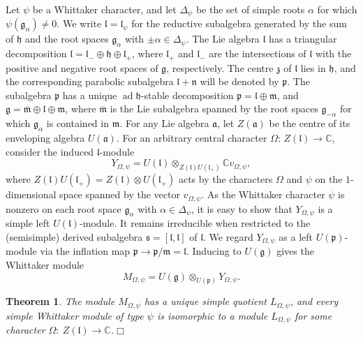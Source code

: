 \documentclass[11pt]{article}
\newtheorem{theorem}[equation]{Theorem}
\numberwithin{equation}{section}
\newcommand{\fg}{\mathfrak{g}}
\newcommand{\ot}{\otimes}
\newcommand{\fh}{{\mathfrak h}}
\newcommand{\ga}{\alpha}
\newcommand{\qed}{\hfill $\Box$}
\begin{document}
Let $\psi$ be a Whittaker character, and let $\Delta_\psi$ be the set of simple roots $\ga$ for which $\psi(\fg_\ga)\neq 0$. We write $\mathfrak{l}=\mathfrak{l}_\psi$ for the reductive subalgebra generated by the sum of $\fh$ and the root spaces $\fg_\ga$ with $\pm\ga\in \Delta_\psi$.  The Lie algebra $\mathfrak{l}$ has a triangular decomposition $\mathfrak{l}=\mathfrak{l}_-\oplus\fh\oplus\mathfrak{l}_+$, where $\mathfrak{l}_+$ and $\mathfrak{l}_-$ are the intersections of $\mathfrak{l}$ with the positive and negative root spaces of $\fg$, respectively.  The centre $\mathfrak{z}$ of $\mathfrak{l}$ lies in $\fh$, and the corresponding parabolic subalgebra $\mathfrak{l}+\mathfrak{n}$ will be denoted by $\mathfrak{p}$.  The subalgebra $\mathfrak{p}$ has a unique $\operatorname{ad}\fh$-stable decomposition $\mathfrak{p}=\mathfrak{l}\oplus\mathfrak{m}$, and $\fg=\overline{\mathfrak{m}}\oplus\mathfrak{l}\oplus\mathfrak{m}$, where $\overline{\mathfrak{m}}$ is the Lie subalgebra spanned by the root spaces $\fg_{-\ga}$ for which $\fg_\ga$ is contained in $\mathfrak{m}$.  For any Lie algebra $\mathfrak{a}$, let  $Z(\mathfrak{a})$ be the centre of its enveloping algebra $U(\mathfrak{a})$.  For an arbitrary central character $\Omega:\,Z(\mathfrak{l})\rightarrow\mathbb{C}$, consider the induced $\mathfrak{l}$-module
$$Y_{\Omega,\psi}=U(\mathfrak{l})\ot_{Z(\mathfrak{l})U(\mathfrak{l}_+)}\mathbb{C}v_{\Omega,\psi},$$
where $Z(\mathfrak{l})U(\mathfrak{l}_+)=Z(\mathfrak{l})\ot U(\mathfrak{l}_+)$ acts by the characters $\Omega$ and $\psi$ on the $1$-dimensional space spanned by the vector $v_{\Omega,\psi}$.  As the Whittaker character $\psi$ is nonzero on each root space $\fg_\ga$ with $\ga\in\Delta_\psi$, it is easy to show that $Y_{\Omega,\psi}$ is a simple left $U(\mathfrak{l})$-module.  It remains irreducible when restricted to the (semisimple) derived subalgebra $\mathfrak{s}=[\mathfrak{l},\mathfrak{l}]$ of $\mathfrak{l}$.  We regard $Y_{\Omega,\psi}$ as a left $U(\mathfrak{p})$-module via the inflation map $\mathfrak{p}\rightarrow\mathfrak{p}/\mathfrak{m}=\mathfrak{l}$.  Inducing to $U(\mathfrak{g})$ gives the Whittaker module
$$M_{\Omega,\psi}=U(\mathfrak{g})\ot_{U(\mathfrak{p})}Y_{\Omega,\psi}.$$
\begin{theorem}{\em \cite[Theorem 2.9]{mcdowell85}}  The module $M_{\Omega,\psi}$ has a unique simple quotient $L_{\Omega,\psi}$, and every simple Whittaker module of type $\psi$ is isomorphic to a module $L_{\Omega,\psi}$ for some character $\Omega:\ Z(\mathfrak{l})\rightarrow\mathbb{C}$.\qed

  \end{theorem}
\end{document}
